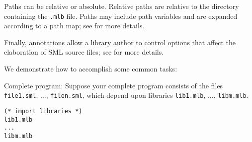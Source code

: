 Paths can be relative or absolute.  Relative paths are relative to the
directory containing the {\tt .mlb} file.  Paths may include path
variables and are expanded according to a path map; see
 for more details.

Finally, annotations allow a library author to control options that
affect the elaboration of SML source files; see  for
more details.

%

We demonstrate how to accomplish some common tasks:
\begin{description}
\item{Complete program:}
Suppose your complete program consists of the files {\tt file1.sml},
$\ldots$, {\tt filen.sml}, which depend upon libraries {\tt lib1.mlb},
$\ldots$, {\tt libm.mlb}.
\begin{verbatim}
(* import libraries *)
lib1.mlb
...
libm.mlb


\end{verbatim}
\end{description}
